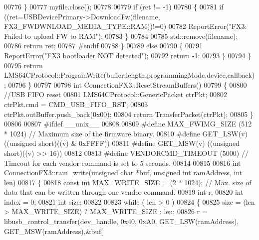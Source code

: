 \begin{DoxyCode}
{{{{00776             \}
00777             myfile.close();
00778 
00779             \textcolor{keywordflow}{if} (ret != -1)
00780             \{
00781                 \textcolor{keywordflow}{if} ((ret=USBDevicePrimary->DownloadFw(filename, 
      FX3_FWDWNLOAD_MEDIA_TYPE::RAM))!=0)
00782                     ReportError(\textcolor{stringliteral}{"FX3: Failed to upload FW to RAM"});
00783             \}
00784 
00785             std::remove(filename);
00786             \textcolor{keywordflow}{return} ret;
00787 \textcolor{preprocessor}{#endif}
00788         \}
00789             \textcolor{keywordflow}{else}
00790             \{
00791                 ReportError(\textcolor{stringliteral}{"FX3 bootloader NOT detected"});
00792                 \textcolor{keywordflow}{return} -1;
00793             \}
00794     \}
00795     \textcolor{keywordflow}{return} LMS64CProtocol::ProgramWrite(buffer,length,programmingMode,device,callback);
00796 \}
00797 
00798 \textcolor{keywordtype}{int} ConnectionFX3::ResetStreamBuffers()
00799 \{
00800     \textcolor{comment}{//USB FIFO reset}
00801     LMS64CProtocol::GenericPacket ctrPkt;
00802     ctrPkt.cmd = CMD_USB_FIFO_RST;
00803     ctrPkt.outBuffer.push\_back(0x00);
00804     \textcolor{keywordflow}{return} TransferPacket(ctrPkt);
00805 \}
00806 
00807 \textcolor{preprocessor}{#ifdef \_\_unix\_\_}
00808 
00809 \textcolor{preprocessor}{#define MAX\_FWIMG\_SIZE  (512 * 1024)        // Maximum size of the firmware binary.}
00810 \textcolor{preprocessor}{#define GET\_LSW(v)  ((unsigned short)((v) & 0xFFFF))}
00811 \textcolor{preprocessor}{#define GET\_MSW(v)  ((unsigned short)((v) >> 16))}
00812 
00813 \textcolor{preprocessor}{#define VENDORCMD\_TIMEOUT   (5000)      // Timeout for each vendor command is set to 5 seconds.}
00814 
00815 
00816 \textcolor{keywordtype}{int} ConnectionFX3::ram\_write(\textcolor{keywordtype}{unsigned} \textcolor{keywordtype}{char} *buf, \textcolor{keywordtype}{unsigned} \textcolor{keywordtype}{int} ramAddress, \textcolor{keywordtype}{int} 
      len)
00817 \{
00818     \textcolor{keyword}{const} \textcolor{keywordtype}{int} MAX\_WRITE\_SIZE = (2 * 1024);      \textcolor{comment}{// Max. size of data that can be written through one vendor
       command.}
00819     \textcolor{keywordtype}{int} r;
00820     \textcolor{keywordtype}{int} index = 0;
00821     \textcolor{keywordtype}{int} size;
00822 
00823     \textcolor{keywordflow}{while} ( len > 0 )
00824     \{
00825         size = (len > MAX\_WRITE\_SIZE) ? MAX\_WRITE\_SIZE : len;
00826         r = libusb\_control\_transfer(dev\_handle, 0x40, 0xA0, GET\_LSW(ramAddress), GET\_MSW(ramAddress),&buf[
}}}}
\end{DoxyCode}
